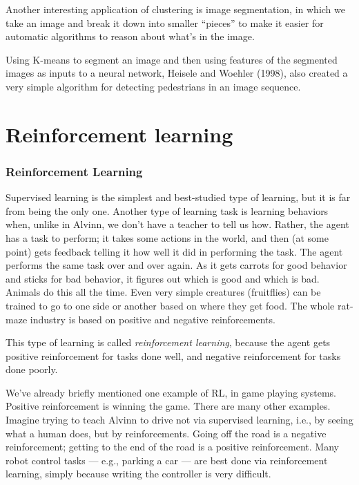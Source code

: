 Another interesting application of clustering is image segmentation, in which we take an image
and break it down into smaller ``pieces'' to make it easier for automatic algorithms
to reason about what's in the image.  

Using K-means to segment an image and then using features of the segmented images
as inputs to a neural network, Heisele and Woehler (1998), also created a very 
simple algorithm for detecting pedestrians in an image sequence. 




\part{Reinforcement learning} 


\section{Reinforcement Learning}
Supervised learning is the simplest and best-studied type of learning, but
it is far from being the only one.  Another type of learning task is
learning behaviors when, unlike in Alvinn, we don't have a teacher to tell
us how.  Rather, the agent has a task to perform; it takes some actions in
the world, and then (at some point) gets feedback telling it how well it did
in performing the task. The agent performs the same task over and over
again.  As it gets carrots for good behavior and sticks for bad behavior, it
figures out which is good and which is bad.  Animals do this all the time.
Even very simple creatures (fruitflies) can be trained to go to one side or
another based on where they get food.  The whole rat-maze industry is based
on positive and negative reinforcements. 

This type of learning is called {\em reinforcement learning}, because the
agent gets positive reinforcement for tasks done well, and negative
reinforcement for tasks done poorly.

We've already briefly mentioned one example of RL, in game playing systems.
Positive reinforcement is winning the game.  There are many other examples.
Imagine trying to teach Alvinn to drive not via supervised learning, i.e.,
by seeing what a human does, but by reinforcements.  Going off the road is a
negative reinforcement; getting to the end of the road is a positive
reinforcement.  Many robot control tasks --- e.g., parking a car --- are
best done via reinforcement learning, simply because writing the controller
is very difficult.

